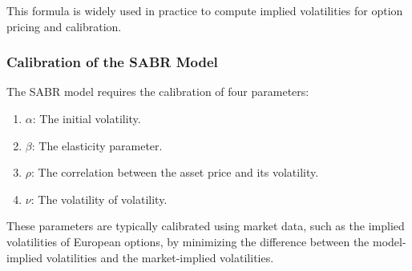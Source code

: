 \documentclass[11pt, oneside, a4paper, titlepage]{report}
\begin{document}
This formula is widely used in practice to compute implied volatilities for option pricing and calibration.

\subsubsection{Calibration of the SABR Model}

The SABR model requires the calibration of four parameters:
\begin{enumerate}
    \item \( \alpha \): The initial volatility.
    \item \( \beta \): The elasticity parameter.
    \item \( \rho \): The correlation between the asset price and its volatility.
    \item \( \nu \): The volatility of volatility.
\end{enumerate}

These parameters are typically calibrated using market data, such as the implied volatilities of European options, by minimizing the difference between the model-implied volatilities and the market-implied volatilities.
\end{document}

